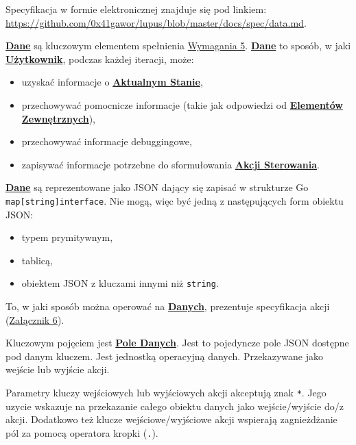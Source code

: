 \label{appendix:5}

Specyfikacja w formie elektronicznej znajduje się pod linkiem: \url{https://github.com/0x41gawor/lupus/blob/master/docs/spec/data.md}.

\hyperlink{def:dane}{\textbf{Dane}} są kluczowym elementem spełnienia \hyperref[req:5]{Wymagania 5}. \hyperlink{def:dane}{\textbf{Dane}} to sposób, w jaki \hyperlink{def:uzytkownik}{\textbf{Użytkownik}}, podczas każdej iteracji, może:
\begin{itemize}
    \item uzyskać informacje o \hyperlink{def:stan-aktualny}{\textbf{Aktualnym Stanie}},
    \item przechowywać pomocnicze informacje (takie jak odpowiedzi od \hyperlink{def:element-zewnetrzny}{\textbf{Elementów Zewnętrznych}}),
    \item przechowywać informacje debuggingowe,
    \item zapisywać informacje potrzebne do sformułowania \hyperlink{def:akcja-sterujaca}{\textbf{Akcji Sterowania}}.
\end{itemize}

\hyperlink{def:dane}{\textbf{Dane}} są reprezentowane jako JSON dający się zapisać w strukturze Go \texttt{map[string]interface{}}. Nie mogą, więc być jedną z następujących form obiektu JSON:
\begin{itemize}
    \item typem prymitywnym,
    \item tablicą,
    \item obiektem JSON z kluczami innymi niż \texttt{string}.
\end{itemize}

To, w jaki sposób można operować na \hyperlink{def:dane}{\textbf{Danych}}, prezentuje specyfikacja akcji (\hyperref[appendix:6]{Załącznik 6}).


Kluczowym pojęciem jest \hyperlink{def:pole-danych}{\textbf{Pole Danych}}. Jest to pojedyncze pole JSON dostępne pod danym kluczem. Jest jednostką operacyjną danych. Przekazywane jako wejście lub wyjście akcji. 

Parametry kluczy wejściowych lub wyjściowych akcji akceptują znak \texttt{*}. Jego uzycie wskazuje na przekazanie całego obiektu danych jako wejście/wyjście do/z akcji. Dodatkowo też klucze wejściowe/wyjściowe akcji wspierają zagnieżdżanie pól za pomocą operatora kropki (\texttt{.}).
